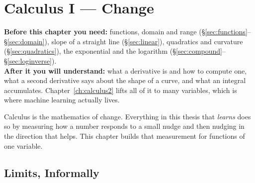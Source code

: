 \chapter{Calculus I --- Change}
\label{ch:calculus1}

\begin{tcolorbox}[feynbox={Sky}{BBg},title={Before and After}]
\textbf{Before this chapter you need:} functions, domain and range
(\S\ref{sec:functions}--\S\ref{sec:domain}), slope of a straight line
(\S\ref{sec:linear}), quadratics and curvature (\S\ref{sec:quadratics}),
the exponential and the logarithm (\S\ref{sec:compound}--\S\ref{sec:loginverse}).\\
\textbf{After it you will understand:} what a derivative is and how to compute
one, what a second derivative says about the shape of a curve, and what an
integral accumulates. Chapter~\ref{ch:calculus2} lifts all of it to many
variables, which is where machine learning actually lives.
\end{tcolorbox}

Calculus is the mathematics of change. Everything in this thesis that
\emph{learns} does so by measuring how a number responds to a small nudge and
then nudging in the direction that helps. This chapter builds that measurement
for functions of one variable.

\section{Limits, Informally}
\label{sec:limits}



